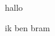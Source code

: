 \documentclass{article}
\begin{document}
hallo \cite{ref2}

ik ben bram \cite{ref1}


\end{document}
